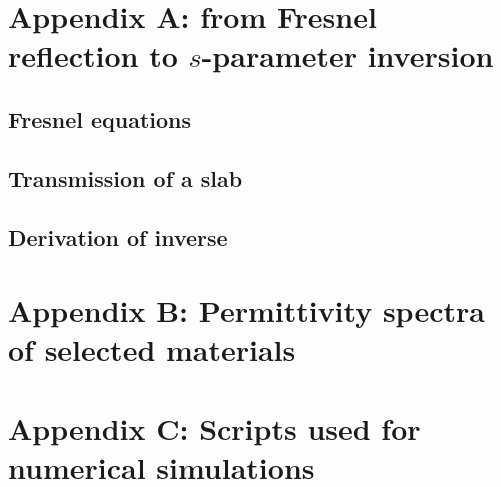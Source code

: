 
\section{Appendix A: from Fresnel reflection to $s$-parameter inversion} %
\subsection{Fresnel equations} %
\subsection{Transmission of a slab} %
\subsection{Derivation of inverse } %

\section{Appendix B: Permittivity spectra of selected materials} %

\section{Appendix C: Scripts used for numerical simulations} %
